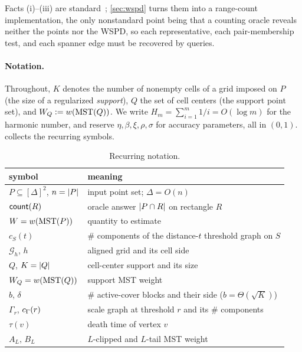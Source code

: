 Facts (i)--(iii) are standard~\cite{HarPeled11}; \cref{sec:wspd} turns them into a range-count
implementation, the only nonstandard point being that a counting oracle reveals neither the points nor the
WSPD, so each representative, each pair-membership test, and each spanner edge must be recovered by
queries.

\paragraph{Notation.}
Throughout, $K$ denotes the number of nonempty cells of a grid imposed on $P$ (the size of a regularized
\emph{support}), $Q$ the set of cell centers (the support point set), and $W_Q\vcentcolon=w(\mathrm{MST}(Q))$. We
write $H_m=\sum_{i=1}^m 1/i=O(\log m)$ for the harmonic number, and reserve $\eta,\beta,\xi,\rho,\sigma$
for accuracy parameters, all in $(0,1)$.  collects the recurring symbols.

\begin{table}[t]
\centering
\small
\begin{tabular}{ll}
\toprule
symbol & meaning\\
\midrule
$P\subseteq[\Delta]^2$, $n=\left|P\right|$ & input point set; $\Delta=O(n)$\\
$\mathsf{count}(R)$ & oracle answer $\left|P\cap R\right|$ on rectangle $R$\\
$W=w(\mathrm{MST}(P))$ & quantity to estimate\\
$c_S(t)$ & \# components of the distance-$t$ threshold graph on $S$\\
$\mathcal G_h$, $h$ & aligned grid and its cell side\\
$Q$, $K=\left|Q\right|$ & cell-center support and its size\\
$W_Q=w(\mathrm{MST}(Q))$ & support MST weight\\
$b$, $\delta$ & \# active-cover blocks and their side ($b=\Theta(\sqrt K)$)\\
$\Gamma_r$, $c_\Gamma(r)$ & scale graph at threshold $r$ and its \# components\\
$\tau(v)$ & death time of vertex $v$\\
$A_L,\,B_L$ & $L$-clipped and $L$-tail MST weight\\
\bottomrule
\end{tabular}
\caption{Recurring notation.}
\label{tab:notation}
\end{table}

